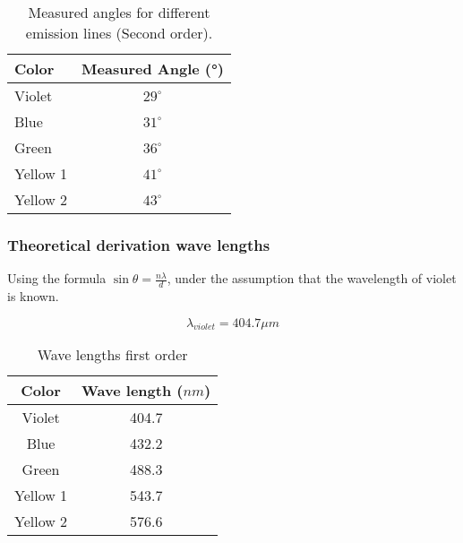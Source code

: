             \begin{table}[H]
                \centering
                \begin{tabular}{l|c}
                     \textbf{Color} & \textbf{Measured Angle (°)}\\
                     \hline
                     Violet & $29^\circ$\\
                     Blue & $31^\circ$\\
                     Green & $36^\circ$\\
                     Yellow 1& $41^\circ$\\
                     Yellow 2& $43^\circ$\\
                \end{tabular}
                \caption{Measured angles for different emission lines (Second order).}
                \label{tab:measured_angles_second}
            \end{table}
            
        \subsubsection{Theoretical derivation wave lengths}
        
            Using the formula $\sin{\theta} = \frac{n\lambda}{d}$, under the assumption that the wavelength of violet is known.

            \begin{equation}
                \lambda_{violet} = 404.7\mu m
            \end{equation}

            \begin{table}[H]
                \centering
                \begin{tabular}{c|c}
                     \textbf{Color} & \textbf{Wave length ($nm$)} \\
                     \hline
                     Violet &  404.7\\
                     Blue &  432.2\\
                     Green & 488.3\\
                     Yellow 1 & 543.7\\
                     Yellow 2 & 576.6\\
                \end{tabular}
                \caption{Wave lengths first order}
                \label{tab:wavelengths}
            \end{table}

